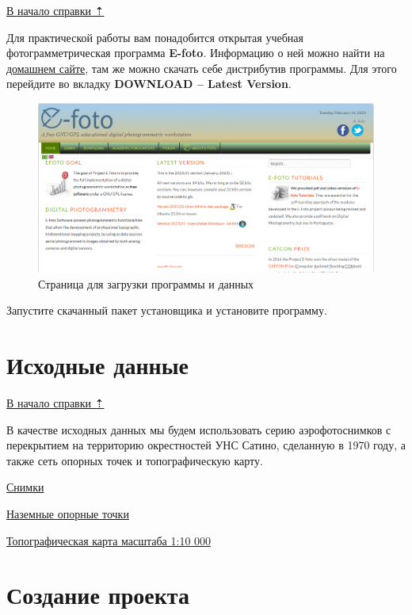 \documentclass[
  12pt,
]{book}
\begin{document}
\protect\hyperlink{stereo}{В начало справки ⇡}

Для практической работы вам понадобится открытая учебная фотограмметрическая программа \textbf{E-foto}. Информацию о ней можно найти на \href{http://www.efoto.eng.uerj.br/}{домашнем сайте}, там же можно скачать себе дистрибутив программы. Для этого перейдите во вкладку \textbf{DOWNLOAD -- Latest Version}.

\begin{figure}
\centering
\includegraphics{images/Ref13/Download.png}
\caption{Страница для загрузки программы и данных}
\end{figure}

Запустите скачанный пакет установщика и установите программу.

\hypertarget{stereo-initial}{%
\section{Исходные данные}\label{stereo-initial}}

\protect\hyperlink{stereo}{В начало справки ⇡}

В качестве исходных данных мы будем использовать серию аэрофотоснимков с перекрытием на территорию окрестностей УНС Сатино, сделанную в 1970 году, а также сеть опорных точек и топографическую карту.

\href{https://yadi.sk/d/x7V_hMkPuviJVw}{Снимки}

\href{https://yadi.sk/d/gEQC2jcCFJGifA}{Наземные опорные точки}

\href{https://yadi.sk/i/XM7Z30SZcvy6IA}{Топографическая карта масштаба 1:10 000}

\hypertarget{stereo-create_project}{%
\section{Создание проекта}\label{stereo-create_project}}
\end{document}
